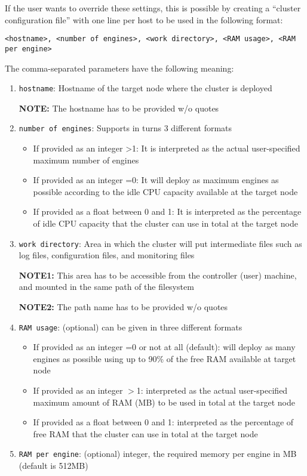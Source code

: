 If the user wants to override these settings, this is possible by creating
a ``cluster configuration file'' with one line per host to be used in the
following format:

{\small
\begin{verbatim} 
<hostname>, <number of engines>, <work directory>, <RAM usage>, <RAM per engine> 
\end{verbatim}
}

The comma-separated parameters have the following meaning:

\begin{enumerate}

\item {\tt hostname}: Hostname of the target node where the cluster is deployed

{\bf NOTE:} The hostname has to be provided w/o quotes

\item {\tt number of engines}: Supports in turns 3 different formats
\begin{itemize}
\item  If provided as an integer >1: It is interpreted as the actual user-specified 
maximum number of engines
\item  If provided as an integer =0: It will deploy as maximum engines as possible 
according to the idle CPU capacity available at the target node
\item  If provided as a float between 0 and 1: It is interpreted as the percentage 
of idle CPU capacity that the cluster can use in total at the target node
\end{itemize}


\item {\tt work directory}: Area in which the cluster will put intermediate files such as log files, configuration files, and monitoring files 

{\bf NOTE1:} This area has to be accessible from the controller (user) machine, and mounted in the same path of the filesystem

{\bf NOTE2:} The path name has to be provided w/o quotes

\item {\tt RAM usage}: (optional) can be given in three different formats 
\begin{itemize}
\item  If provided as an integer =0 or not at all (default): will deploy as many engines as possible using up to 90\% of the free RAM available at target node 
\item  If provided as an integer $>$1: interpreted as the actual user-specified maximum amount of RAM (MB) to be used in total at the target node
\item  If provided as a float between 0 and 1: interpreted as the percentage of free RAM that the cluster can use in total at the target node
\end{itemize}


\item {\tt RAM per engine}: (optional) integer, the required memory per engine in MB (default is 512MB) 

\end{enumerate}
